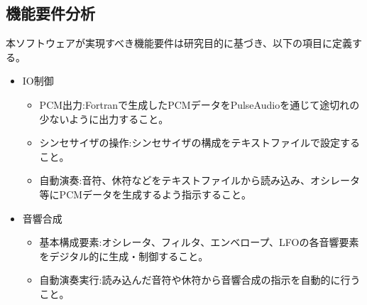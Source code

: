 \documentclass[dvipdfmx]{ujarticle}
\begin{document}
\subsection{機能要件分析}
本ソフトウェアが実現すべき機能要件は研究目的に基づき、以下の項目に定義する。
\begin{itemize}
  \setlength{\itemsep}{-0.5mm}
  \setlength{\parskip}{0mm}
\item IO制御
  \begin{itemize}
  \setlength{\itemsep}{-0.5mm}
  \setlength{\parskip}{0mm}
  \item PCM出力:Fortranで生成したPCMデータをPulseAudioを通じて途切れの少ないように出力すること。
  \item シンセサイザの操作:シンセサイザの構成をテキストファイルで設定すること。
  \item 自動演奏:音符、休符などをテキストファイルから読み込み、オシレータ等にPCMデータを生成するよう指示すること。
  \end{itemize}
\item 音響合成
  \begin{itemize}
  \setlength{\itemsep}{-0.5mm}
  \setlength{\parskip}{0mm}
  \item 基本構成要素:オシレータ、フィルタ、エンベロープ、LFOの各音響要素をデジタル的に生成・制御すること。
  \item 自動演奏実行:読み込んだ音符や休符から音響合成の指示を自動的に行うこと。
  \end{itemize}
\end{itemize}
\end{document}
